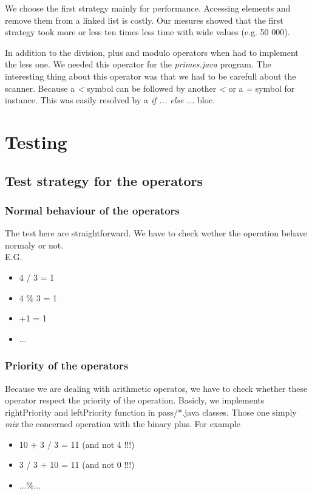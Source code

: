 \documentclass[10pt,a4paper]{article}
\begin{document}
We choose the first strategy mainly for performance. Accessing elements and remove them from a linked list is costly. Our mesures showed that the first strategy took more or less ten times less time with wide values (e.g. 50 000).

In addition to the division, plus and modulo operators when had to implement the less one. We needed this operator for the \emph{primes.java} program. The interesting thing about this operator was that we had to be carefull about the scanner. Because a \emph{<} symbol can be followed by another \emph{<} or a \emph{=} symbol for instance. This was easily resolved by a \emph{if ... else ...} bloc.

\section{Testing}
\subsection{Test strategy for the operators}
\subsubsection{Normal behaviour of the operators}
	The test here are straightforward. We have to check wether the operation behave normaly or not. \\
	E.G.
	\begin{itemize}
		\item{4 / 3 = 1}
		\item{4 \% 3 = 1}
		\item{+1 = 1}
		\item{...}
	\end{itemize}
\subsubsection{Priority of the operators}
	Because we are dealing with arithmetic operatos, we have to check whether these operator respect the priority of the operation. Basicly, we implements rightPriority and leftPriority function in pass/*.java classes. Those one simply \textit{mix} the concerned operation with the binary plus.
	For example
	\begin{itemize}
		\item{10 + 3 / 3 = 11 (and not 4 !!!)}
		\item{3 / 3 + 10 = 11 (and not 0 !!!)}
		\item{...\%...}
	\end{itemize}		
\end{document}
